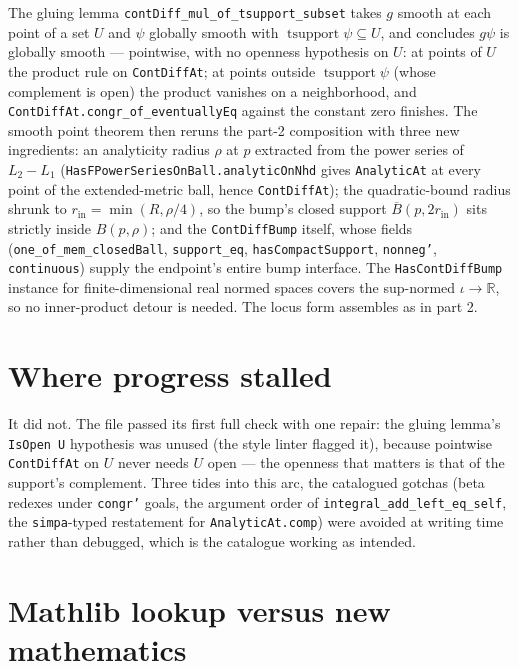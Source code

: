 \documentclass[11pt]{article}
\newcommand{\R}{\mathbb{R}}
\newcommand{\code}[1]{\texttt{#1}}
\begin{document}
\begin{sloppypar}
The gluing lemma \code{contDiff\_mul\_of\_tsupport\_subset} takes $g$
smooth at each point of a set $U$ and $\psi$ globally smooth with
$\operatorname{tsupport}\psi \subseteq U$, and concludes $g\psi$ is
globally smooth --- pointwise, with no openness hypothesis on $U$:
at points of $U$ the product rule on \code{ContDiffAt}; at points
outside $\operatorname{tsupport}\psi$ (whose complement is open) the
product vanishes on a neighborhood, and
\code{ContDiffAt.congr\_of\_eventuallyEq} against the constant zero
finishes. The smooth point theorem then reruns the part-2
composition with three new ingredients: an analyticity radius $\rho$
at $p$ extracted from the power series of $L_2 - L_1$
(\code{HasFPowerSeriesOnBall.analyticOnNhd} gives \code{AnalyticAt}
at every point of the extended-metric ball, hence \code{ContDiffAt});
the quadratic-bound radius shrunk to
$r_{\mathrm{in}} = \min(R, \rho/4)$, so the bump's closed support
$\overline{B}(p, 2r_{\mathrm{in}})$ sits strictly inside $B(p,\rho)$;
and the \code{ContDiffBump} itself, whose fields
(\code{one\_of\_mem\_closedBall}, \code{support\_eq},
\code{hasCompactSupport}, \code{nonneg'}, \code{continuous}) supply
the endpoint's entire bump interface. The
\code{HasContDiffBump} instance for finite-dimensional real normed
spaces covers the sup-normed $\iota \to \R$, so no inner-product
detour is needed. The locus form assembles as in part 2.
\end{sloppypar}

\section{Where progress stalled}

It did not. The file passed its first full check with one repair:
the gluing lemma's \code{IsOpen U} hypothesis was unused (the
style linter flagged it), because pointwise \code{ContDiffAt} on $U$
never needs $U$ open --- the openness that matters is that of the
support's complement. Three tides into this arc, the catalogued
gotchas (beta redexes under \code{congr'} goals, the
argument order of \code{integral\_add\_left\_eq\_self}, the
\code{simpa}-typed restatement for \code{AnalyticAt.comp}) were
avoided at writing time rather than debugged, which is the catalogue
working as intended.

\section{Mathlib lookup versus new mathematics}
\end{document}
